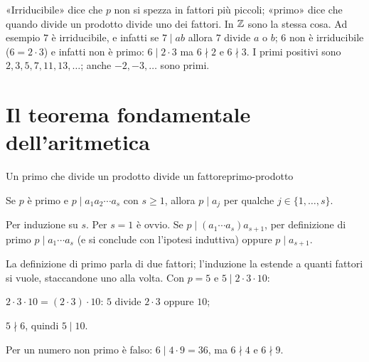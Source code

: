 \begin{spiegazione}
    «Irriducibile» dice che $p$ non si spezza in fattori più piccoli; «primo» dice che quando divide un prodotto divide uno dei fattori.
    In $\mathbb{Z}$ sono la stessa cosa. Ad esempio $7$ è irriducibile, e infatti se $7 \mid ab$ allora $7$ divide $a$ o $b$; $6$ non è irriducibile
    ($6 = 2 \cdot 3$) e infatti non è primo: $6 \mid 2 \cdot 3$ ma $6 \nmid 2$ e $6 \nmid 3$. I primi positivi sono $2, 3, 5, 7, 11, 13, \dots$; anche $-2, -3, \dots$
    sono primi.
\end{spiegazione}

\section{Il teorema fondamentale dell'aritmetica}\label{sec:tfa}

\begin{concetto}
\begin{Lemma}{Un primo che divide un prodotto divide un fattore}{primo-prodotto}
    \begin{prerequisiti}
    \end{prerequisiti}
    Se $p$ è primo e $p \mid a_1 a_2 \cdots a_s$ con $s \geq 1$, allora $p \mid a_j$ per qualche $j \in \{1, \dots, s\}$.
\end{Lemma}
\begin{dimostrazione}
    Per induzione su $s$. Per $s = 1$ è ovvio. Se $p \mid (a_1 \cdots a_s) a_{s + 1}$, per definizione di primo $p \mid a_1 \cdots a_s$ (e si conclude con
    l'ipotesi induttiva) oppure $p \mid a_{s + 1}$.
\end{dimostrazione}
\end{concetto}

\begin{spiegazione}
    La definizione di primo parla di due fattori; l'induzione la estende a quanti fattori si vuole, staccandone uno alla volta. Con $p = 5$ e $5 \mid 2 \cdot 3 \cdot 10$:
    \begin{passi}
        \item $2 \cdot 3 \cdot 10 = (2 \cdot 3) \cdot 10$: $5$ divide $2 \cdot 3$ oppure $10$;
        \item $5 \nmid 6$, quindi $5 \mid 10$.
    \end{passi}
    Per un numero non primo è falso: $6 \mid 4 \cdot 9 = 36$, ma $6 \nmid 4$ e $6 \nmid 9$.
\end{spiegazione}



